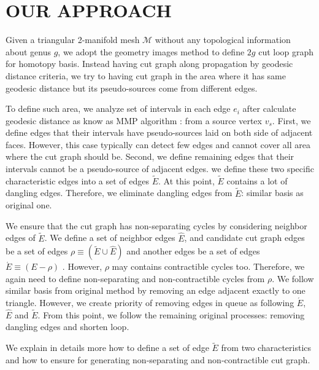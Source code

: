 \documentclass[a4paper,twoside]{article}
\begin{document}
\section{\uppercase{Our Approach}}
\label{sec:our approach}
\noindent Given a triangular 2-manifold mesh $\mathscr{M}$ without any topological information about genus $g$, we adopt the geometry images method \cite{Gu:2002:GI:566654.566589} to define $2g$ cut loop graph for homotopy basis. Instead having cut graph along propagation by geodesic distance criteria, we try to having cut graph in the area where it has same geodesic distance but its pseudo-sources come from different edges.

To define such area, we analyze set of intervals in each edge $e_i$ after calculate geodesic distance \cite{Mitchell:1987:DGP:33367.33372,Surazhsky:2005:FEA:1073204.1073228} as know as MMP algorithm : from a source vertex $v_{s}$. First, we define edges that their intervals have pseudo-sources laid on both side of adjacent faces. However, this case typically can detect few edges and cannot cover all area where the cut graph should be. Second, we define remaining edges that their intervals cannot be a pseudo-source of adjacent edges. we define these two specific characteristic edges into a set of edges $\tilde{E}$. At this point, $\tilde{E}$ contains a lot of dangling edges. Therefore, we eliminate dangling edges from $\tilde{E}$: similar basis as original one.

We ensure that the cut graph has non-separating cycles by considering neighbor edges of $\tilde{E}$. We define a set of neighbor edges $\hat{E}$, 
and candidate cut graph edges be a set of edges $\rho \equiv (\tilde{E} \cup \hat{E})$ and another edges be a set of edges $\acute{E} \equiv (E - \rho)$ . However, $\rho$ may contains contractible cycles too. Therefore, we again need to define non-separating and non-contractible cycles from $\rho$. We follow similar basis from original method by removing an edge adjacent exactly to one triangle. However, we create priority of removing edges in queue as following $\acute{E}$,  $\hat{E}$ and $\tilde{E}$. From this point, we follow the remaining original processes: removing dangling edges and shorten loop.

We explain in details more how to define a set of edge $\tilde{E}$ from two characteristics and how to ensure for generating non-separating and non-contractible cut graph.
\end{document}
